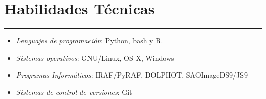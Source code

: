 \documentclass[letterpaper,10pt]{article}
\begin{document}
\section*{Habilidades T\'ecnicas}
\hrule
\vspace{.3 cm}
    \begin{multicols}{2}




\begin{itemize}[label=$\blacktriangleright$]
	\item \emph{Lenguajes de programaci\'on}: Python, bash y R. 
\end{itemize}



  \begin{itemize}[label=$\blacktriangleright$]
  \item \emph{Sistemas operativos}: GNU/Linux, OS X, Windows
    \end{itemize}

  \begin{itemize}[label=$\blacktriangleright$]
          \item \emph{Programas Inform\'aticos}: IRAF/PyRAF, DOLPHOT, SAOImageDS9/JS9
    \end{itemize}

  \begin{itemize}[label=$\blacktriangleright$]
          \item \emph{Sistemas de control de versiones}: Git
    \end{itemize}
  

    
    
        \end{multicols}

\end{document}
